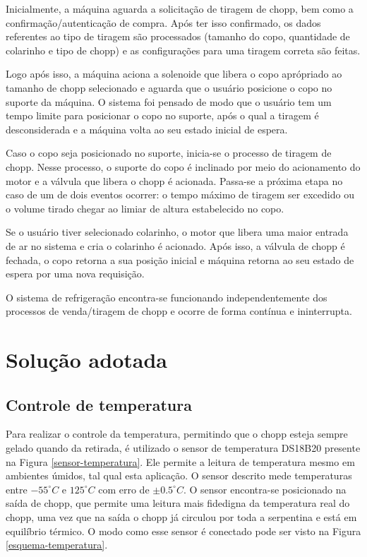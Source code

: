 Inicialmente, a máquina aguarda a solicitação de tiragem de chopp, bem como a confirmação/autenticação de compra. 
Após ter isso confirmado, os dados referentes ao tipo de tiragem são processados (tamanho do copo, quantidade de colarinho
e tipo de chopp) e as configurações para uma tiragem correta são feitas.

Logo após isso, a máquina aciona a solenoide que libera o copo aprópriado ao tamanho de chopp selecionado e aguarda que o 
usuário  posicione o copo no suporte da máquina. O  sistema foi pensado de modo que o usuário tem um tempo limite para
posicionar o copo no suporte, após o qual a tiragem é desconsiderada e a máquina volta ao seu estado inicial de espera.

Caso o copo seja posicionado no suporte, inicia-se o processo de tiragem de chopp. Nesse processo, o suporte do copo é
inclinado por meio do acionamento do motor e a válvula que libera o chopp é acionada. Passa-se a próxima etapa no caso de um
de dois eventos ocorrer: o tempo máximo de tiragem ser excedido ou o 
volume tirado chegar ao limiar de altura estabelecido no copo.

Se o usuário tiver selecionado colarinho, o motor que libera uma maior entrada de ar no sistema e cria o colarinho é 
acionado. Após isso, a válvula de chopp é fechada, o copo retorna a sua 
posição inicial e máquina retorna ao seu estado de espera por uma nova requisição.

O sistema de refrigeração encontra-se funcionando independentemente dos processos de venda/tiragem de chopp e ocorre de forma
contínua e ininterrupta.

\section{Solução adotada}

\subsection{Controle de temperatura}

Para realizar o controle da temperatura, permitindo que o chopp esteja sempre gelado quando da retirada, 
é utilizado o sensor de temperatura DS18B20 presente na Figura \ref{sensor-temperatura}. 
Ele  permite a leitura de temperatura  mesmo em ambientes úmidos, tal qual esta aplicação. 
O sensor descrito mede temperaturas entre   $ -55 ^\circ C$ e $125 ^\circ C$ com erro de $\pm 0.5 ^\circ C$.
O sensor encontra-se posicionado na saída de chopp, que permite uma leitura mais fidedigna da
temperatura real do chopp, uma vez que  na saída o chopp já circulou por toda a serpentina e está em
equilíbrio térmico. O modo como esse sensor é conectado pode ser visto na Figura \ref{esquema-temperatura}.

